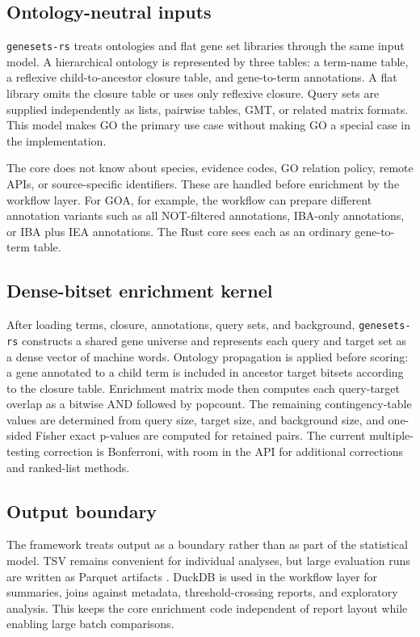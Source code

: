 \documentclass[11pt]{article}
\newcommand{\tool}{\texttt{genesets-rs}}
\begin{document}
\subsection{Ontology-neutral inputs}

\tool{} treats ontologies and flat gene set libraries through the same input model. A hierarchical ontology is represented by three tables: a term-name table, a reflexive child-to-ancestor closure table, and gene-to-term annotations. A flat library omits the closure table or uses only reflexive closure. Query sets are supplied independently as lists, pairwise tables, GMT, or related matrix formats. This model makes GO the primary use case without making GO a special case in the implementation.

The core does not know about species, evidence codes, GO relation policy, remote APIs, or source-specific identifiers. These are handled before enrichment by the workflow layer. For GOA, for example, the workflow can prepare different annotation variants such as all NOT-filtered annotations, IBA-only annotations, or IBA plus IEA annotations. The Rust core sees each as an ordinary gene-to-term table.

\subsection{Dense-bitset enrichment kernel}

After loading terms, closure, annotations, query sets, and background, \tool{} constructs a shared gene universe and represents each query and target set as a dense vector of machine words. Ontology propagation is applied before scoring: a gene annotated to a child term is included in ancestor target bitsets according to the closure table. Enrichment matrix mode then computes each query-target overlap as a bitwise AND followed by popcount. The remaining contingency-table values are determined from query size, target size, and background size, and one-sided Fisher exact p-values are computed for retained pairs. The current multiple-testing correction is Bonferroni, with room in the API for additional corrections and ranked-list methods.

\subsection{Output boundary}

The framework treats output as a boundary rather than as part of the statistical model. TSV remains convenient for individual analyses, but large evaluation runs are written as Parquet artifacts \citep{parquet}. DuckDB \citep{duckdb} is used in the workflow layer for summaries, joins against metadata, threshold-crossing reports, and exploratory analysis. This keeps the core enrichment code independent of report layout while enabling large batch comparisons.
\end{document}
